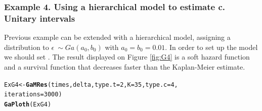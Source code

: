 \documentclass[letterpaper]{article}\usepackage[]{graphicx}\usepackage[]{xcolor}
\makeatletter
\newcommand{\hlnum}[1]{\textcolor[rgb]{0.686,0.059,0.569}{#1}}%
\newcommand{\hlstd}[1]{\textcolor[rgb]{0.345,0.345,0.345}{#1}}%
\newcommand{\hlkwb}[1]{\textcolor[rgb]{0.69,0.353,0.396}{#1}}%
\newcommand{\hlkwc}[1]{\textcolor[rgb]{0.333,0.667,0.333}{#1}}%
\newcommand{\hlkwd}[1]{\textcolor[rgb]{0.737,0.353,0.396}{\textbf{#1}}}%
\newenvironment{kframe}{%
 \def\at@end@of@kframe{}%
 \ifinner\ifhmode%
  \def\at@end@of@kframe{\end{minipage}}%
  \begin{minipage}{\columnwidth}%
 \fi\fi%
 \def\FrameCommand##1{\hskip\@totalleftmargin \hskip-\fboxsep
 \colorbox{shadecolor}{##1}\hskip-\fboxsep
     \hskip-\linewidth \hskip-\@totalleftmargin \hskip\columnwidth}%
 \MakeFramed {\advance\hsize-\width
   \@totalleftmargin\z@ \linewidth\hsize
   \@setminipage}}%
 {\par\unskip\endMakeFramed%
 \at@end@of@kframe}
\newenvironment{knitrout}{}{} %
\makeatother
\begin{document}
\subsubsection{Example 4. Using a hierarchical model to estimate c. Unitary intervals}

Previous example can be extended with a hierarchical model, assigning a distribution to $\epsilon ~ \sim Ga(a_0,b_0)$ with $a_0=b_0=0.01$. In order to set up the model we should set . The result displayed on Figure \ref{fig:G4} is a soft hazard function and a survival function that decreases faster than the Kaplan-Meier estimate.

\begin{knitrout}
\color{fgcolor}\begin{kframe}
\begin{alltt}
\hlstd{ExG4} \hlkwb{<-} \hlkwd{GaMRes}\hlstd{(times, delta,} \hlkwc{type.t} \hlstd{=} \hlnum{2}\hlstd{,} \hlkwc{K} \hlstd{=} \hlnum{35}\hlstd{,} \hlkwc{type.c} \hlstd{=} \hlnum{4}\hlstd{,}
               \hlkwc{iterations} \hlstd{=} \hlnum{3000}\hlstd{)}
\hlkwd{GaPloth}\hlstd{(ExG4)}
\end{alltt}
\end{kframe}
\end{knitrout}
\end{document}

